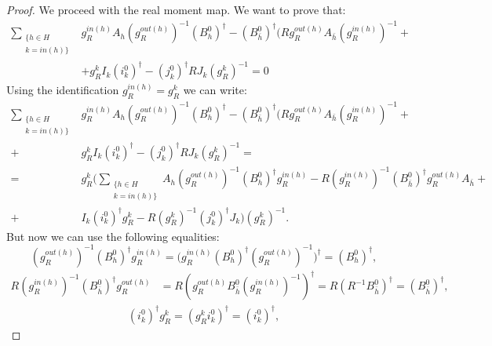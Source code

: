 \documentclass[12pt,oneside,reqno]{amsart}
\theoremstyle{definition}
\numberwithin{equation}{section}
\numberwithin{theorem}{section}
\begin{document}
\begin{proof}
   We proceed with the real moment map. We want to prove that:
   \begin{equation*}
       \begin{split}
           \sum \limits_{\substack{\{h \in H\\k=in(h)\}}} & g_R^{in(h)}A_h(g_R^{out(h)})^{-1}(B_h^0)^\dagger -(B_{\bar h}^0)^\dagger(Rg_R^{out(h)}A_{\bar h}(g_R^{in(h)})^{-1}+ \\
           &+g_R^kI_k(i_k^0)^\dagger-(j_k^0)^\dagger RJ_k(g_R^k)^{-1}=0
       \end{split}
   \end{equation*}
   Using the identification $g_R^{in(h)}=g_R^k$ we can write:
   \begin{equation}\label{sum}
       \begin{split}
           \sum \limits_{\substack{\{h \in H\\k=in(h)\}}}& g_R^{in(h)}A_h(g_R^{out(h)})^{-1}(B_h^0)^\dagger -(B_{\bar h}^0)^\dagger(Rg_R^{out(h)}A_{\bar h}(g_R^{in(h)})^{-1}+ \\
           +&g_R^kI_k(i_k^0)^\dagger-(j_k^0)^\dagger RJ_k(g_R^k)^{-1}= \\
           =&g_R^k\bigg(\sum \limits_{\substack{\{h \in H\\k=in(h)\}}} A_h (g_R^{out(h)})^{-1}(B_h^0)^\dagger g_R^{in(h)}-R(g_R^{in(h)})^{-1}(B_{\bar h}^0)^\dagger g_R^{out(h)}A_{\bar h}+ \\
           +&I_k (i_k^0)^\dagger g_R^k-R(g_R^k)^{-1}(j_k^0)^\dagger J_k\bigg )(g_R^k)^{-1}.
       \end{split}
   \end{equation}
   But now we can use the following equalities:
   \begin{equation}\label{i}
   (g_R^{out(h)})^{-1}(B_h^0)^\dagger g_R^{in(h)}=\big(g_R^{in(h)}(B_h^0)^\dagger (g_R^{out(h)})^{-1}\big)^\dagger =(B_h^0)^\dagger,
   \end{equation}
  \begin{equation}\label{ii}
  \begin{split}
  R(g_R^{in(h)})^{-1}(B_{\bar h}^0)^\dagger g_R^{out(h)}&=R(g_R^{out(h)}B_{\bar h}^0(g_R^{in(h)})^{-1})^\dagger=R(R^{-1}B_{\bar h}^0)^\dagger=(B_{\bar h}^0)^\dagger,
  \end{split}
  \end{equation}
  \begin{equation}\label{iii}
      \begin{split}
          (i_k^0)^\dagger g_R^k=(g_R^ki_k^0)^\dagger=(i_k^0)^\dagger,

\end{split}
\end{equation}
\end{proof}
\end{document}
